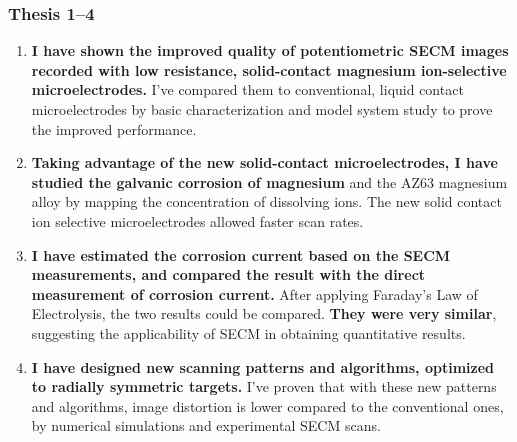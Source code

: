 \documentclass{beamer}
\begin{document}
\begin{frame}
\frametitle{Thesis 1--4}
\scriptsize
\begin{enumerate}
\item \textbf{I have shown the improved quality of potentiometric SECM images recorded with low resistance, solid-contact magnesium ion-selective microelectrodes.}
I've compared them to conventional, liquid contact microelectrodes by basic characterization and model system study to prove the improved performance.

\item \textbf{Taking advantage of the new solid-contact microelectrodes, I have studied the galvanic corrosion of magnesium} and the AZ63 magnesium alloy by mapping the concentration of dissolving ions.
The new solid contact ion selective microelectrodes allowed faster scan rates.

\item \textbf{I have estimated the corrosion current based on the SECM measurements, and compared the result with the direct measurement of corrosion current.}
After applying Faraday's Law of Electrolysis, the two results could be compared.
\textbf{They were very similar}, suggesting the applicability of SECM in obtaining quantitative results.

\item \textbf{I have designed new scanning patterns and algorithms, optimized to radially symmetric targets.}
I've proven that with these new patterns and algorithms, image distortion is lower compared to the conventional ones, by numerical simulations and experimental SECM scans.
\end{enumerate}
\end{frame}
\end{document}
